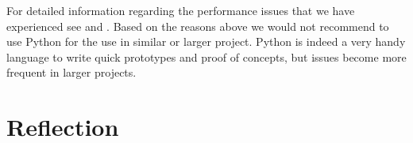 For detailed information regarding the performance issues that we have experienced see \cite{slowpy} and \cite{slowpy2}. Based on the reasons above we would not recommend to use Python for the use in similar or larger project. Python is indeed a very handy language to write quick prototypes and proof of concepts, but issues become more frequent in larger projects.

\section{Reflection}
